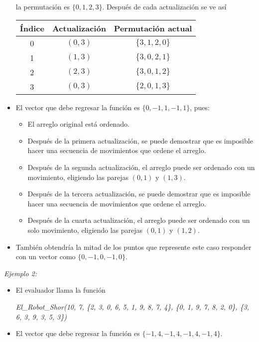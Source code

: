 \documentclass[12pt]{scrartcl}
\begin{document}
\begin{itemize}
            la permutación es $\{0, 1, 2, 3 \}$. Después de cada actualización se ve así
            \begin{center}
                \begin{tabular}{|c|c|c|}
                    \hline
                    Índice & Actualización & Permutación actual \\
                    \hline
                    \hline
                     0 & $(0, 3)$ &  $\{3, 1, 2, 0\}$ \\
                     \hline
                     1 & $(1, 3)$ & $\{3, 0, 2, 1\}$ \\
                     \hline
                     2 & $(2, 3)$ & $\{3, 0, 1, 2\}$ \\
                     \hline
                     3 & $(0, 3)$ & $\{2, 0, 1, 3\}$ \\
                     \hline
                \end{tabular}
            \end{center}
            \item El vector que debe regresar la función es $\{0, -1, 1 , -1, 1\}$, pues:
            \begin{itemize}
                \item  El arreglo original está ordenado.
                \item  Después de la primera actualización, se puede demostrar que es imposible hacer una secuencia de movimientos que ordene el arreglo.
                \item Después de la segunda actualización, el arreglo puede ser ordenado con un movimiento, eligiendo las parejas $(0, 1)$ y $(1, 3)$.
                \item  Después de la tercera actualización, se puede demostrar que es imposible hacer una secuencia de movimientos que ordene el arreglo.
                \item Después de la cuarta actualización, el arreglo puede ser ordenado con un solo movimiento, eligiendo las parejas $(0, 1)$ y $(1, 2)$.
            \end{itemize}
            \item También obtendría la mitad de los puntos que represente este caso responder con un vector como $\{0, -1, 0, -1, 0\}$.
        \end{itemize}
        
        {\itshape Ejemplo 2:}
        \begin{itemize}
            \item El evaluador llama la función 
            \begin{center}
                \textit{El\_Robot\_Shor(10, 7, \{2, 3, 0, 6, 5, 1, 9, 8, 7, 4\}, \{0, 1, 9, 7, 8, 2, 0\}, \{3, 6, 3, 9, 3, 5, 3\})}
            \end{center}
            
            \item El vector que debe regresar la función es $\{-1, 4, -1, 4, -1, 4, -1, 4\}$.
        \end{itemize}
        
\end{document}
